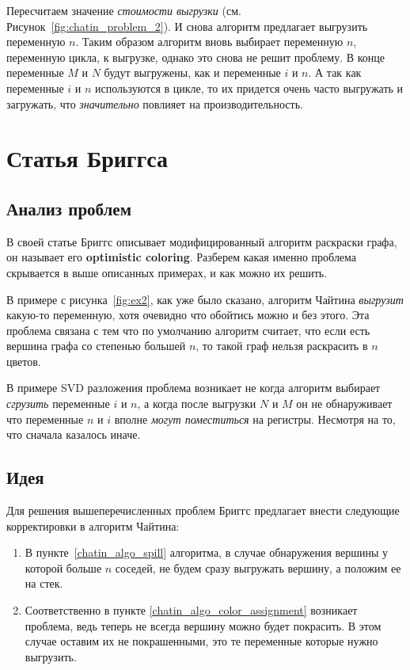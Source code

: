 \documentclass[12pt]{article}
\begin{document}
Пересчитаем значение \textit{стоимости выгрузки} (см. Рисунок~\ref{fig:chatin_problem_2}). И снова алгоритм предлагает
выгрузить переменную $n$. Таким образом алгоритм вновь выбирает переменную $n$, переменную цикла, к выгрузке,
однако это снова не решит проблему. В конце переменные $M$ и $N$ будут выгружены, как и переменные $i$ и $n$.
А так как переменные $i$ и $n$ используются в цикле, то их придется очень часто выгружать и загружать, что
\textit{значительно} повлияет на производительность.

\section{Статья Бриггса}
\subsection{Анализ проблем}

В своей статье Бриггс описывает модифицированный алгоритм раскраски графа, он называет его \textbf{optimistic coloring}.
Разберем какая именно проблема скрывается в выше описанных примерах, и как можно их решить.

В примере с рисунка~\ref{fig:ex2}, как уже было сказано, алгоритм Чайтина \textit{выгрузит} какую-то переменную,
хотя очевидно что обойтись можно и без этого. Эта проблема связана с тем что по умолчанию алгоритм считает,
что если есть вершина графа со степенью большей $n$, то такой граф нельзя раскрасить в $n$ цветов.

В примере SVD разложения проблема возникает не когда алгоритм выбирает \textit{сгрузить} переменные $i$ и $n$, а когда
после выгрузки $N$ и $M$ он не обнаруживает что переменные $n$ и $i$ вполне \textit{могут поместиться} на регистры.
Несмотря на то, что сначала казалось иначе.

\subsection{Идея}

Для решения вышеперечисленных проблем Бриггс предлагает внести следующие корректировки в алгоритм Чайтина:

\begin{enumerate}
    \item В пункте~\ref{chatin_algo_spill} алгоритма, в случае обнаружения вершины у которой больше $n$ соседей,
    не будем сразу выгружать вершину, а положим ее на стек. \label{briggs_change_spill}
    \item Соответственно в пункте \ref{chatin_algo_color_assignment} возникает проблема, ведь теперь не всегда
    вершину можно будет покрасить. В этом случае оставим их не покрашенными, это те переменные которые нужно
    выгрузить.
    
\end{enumerate}
\end{document}
